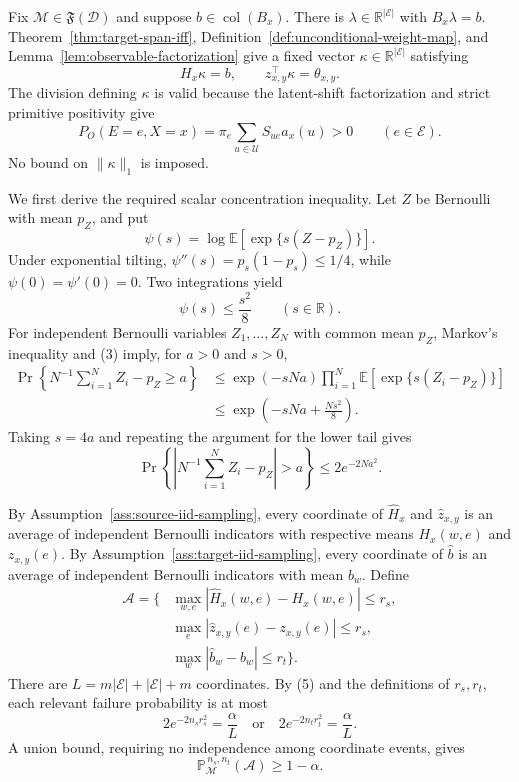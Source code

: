Fix \(\mathcal M\in\mathfrak F(\mathcal D)\) and suppose \(b\in\operatorname{col}(B_x)\).  There is \(\lambda\in\mathbb R^{\lvert\mathcal E\rvert}\) with \(B_x\lambda=b\).  Theorem~\ref{thm:target-span-iff}, Definition~\ref{def:unconditional-weight-map}, and Lemma~\ref{lem:observable-factorization} give a fixed vector \(\kappa\in\mathbb R^{\lvert\mathcal E\rvert}\) satisfying
\[
H_x\kappa=b,
\qquad
z_{x,y}^{\top}\kappa=\theta_{x,y}.
\tag{1}
\]
The division defining \(\kappa\) is valid because the latent-shift factorization and strict primitive positivity give
\[
P_O(E=e,X=x)=\pi_e\sum_{u\in\mathcal U}S_{ue}a_x(u)>0
\qquad(e\in\mathcal E).
\tag{2}
\]
No bound on \(\lVert\kappa\rVert_1\) is imposed.

We first derive the required scalar concentration inequality.  Let \(Z\) be Bernoulli with mean \(p_Z\), and put
\[
\psi(s)=\log\mathbb E\!\left[\exp\{s(Z-p_Z)\}\right].
\]
Under exponential tilting, \(\psi''(s)=p_s(1-p_s)\le1/4\), while \(\psi(0)=\psi'(0)=0\).  Two integrations yield
\[
\psi(s)\le\frac{s^2}{8}
\qquad(s\in\mathbb R).
\tag{3}
\]
For independent Bernoulli variables \(Z_1,\ldots,Z_N\) with common mean \(p_Z\), Markov's inequality and (3) imply, for \(a>0\) and \(s>0\),
\[
\begin{aligned}
\Pr\!\left\{N^{-1}\sum_{i=1}^N Z_i-p_Z\ge a\right\}
&\le \exp(-sNa)\prod_{i=1}^N
 \mathbb E\!\left[\exp\{s(Z_i-p_Z)\}\right]\\
&\le \exp\!\left(-sNa+\frac{Ns^2}{8}\right).
\end{aligned}
\tag{4}
\]
Taking \(s=4a\) and repeating the argument for the lower tail gives
\[
\Pr\!\left\{\left|N^{-1}\sum_{i=1}^N Z_i-p_Z\right|>a\right\}
\le2e^{-2Na^2}.
\tag{5}
\]

By Assumption~\ref{ass:source-iid-sampling}, every coordinate of \(\widehat H_x\) and \(\widehat z_{x,y}\) is an average of independent Bernoulli indicators with respective means \(H_x(w,e)\) and \(z_{x,y}(e)\).  By Assumption~\ref{ass:target-iid-sampling}, every coordinate of \(\widehat b\) is an average of independent Bernoulli indicators with mean \(b_w\).  Define
\[
\begin{aligned}
\mathcal A=\{&\max_{w,e}|\widehat H_x(w,e)-H_x(w,e)|\le r_s,\\
&\max_e|\widehat z_{x,y}(e)-z_{x,y}(e)|\le r_s,\\
&\max_w|\widehat b_w-b_w|\le r_t\}.
\end{aligned}
\tag{6}
\]
There are \(L=m\lvert\mathcal E\rvert+\lvert\mathcal E\rvert+m\) coordinates.  By (5) and the definitions of \(r_s,r_t\), each relevant failure probability is at most
\[
2e^{-2n_s r_s^2}=\frac{\alpha}{L}
\quad\text{or}\quad
2e^{-2n_t r_t^2}=\frac{\alpha}{L}.
\tag{7}
\]
A union bound, requiring no independence among coordinate events, gives
\[
\mathbb P_{\mathcal M}^{\,n_s,n_t}(\mathcal A)\ge1-\alpha.
\tag{8}
\]

